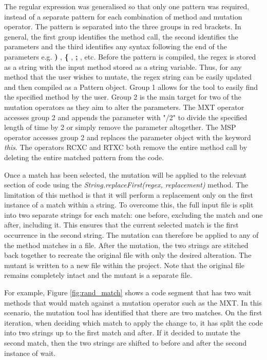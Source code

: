 \documentclass[a4paper,12pt]{article}
\begin{document}
The regular expression was generalised so that only one pattern was required, instead of a separate pattern for each combination of method and mutation operator. The pattern is separated into the three groups in red brackets. In general, the first group identifies the method call, the second identifies the parameters and the third identifies any syntax following the end of the parameters e.g. \textbf{)} , \textbf{\{} , \textbf{;} , etc. Before the pattern is compiled, the regex is stored as a string with the input method stored as a string variable. Thus, for any method that the user wishes to mutate, the regex string can be easily updated and then compiled as a Pattern object. Group 1 allows for the tool to easily find the specified method by the user. Group 2 is the main target for two of the mutation operators as they aim to alter the parameters. The MXT operator accesses group 2 and appends the parameter with "/2" to divide the specified length of time by 2 or simply remove the parameter altogether. The MSP operator accesses group 2 and replaces the parameter object with the keyword \textit{this}. The operators RCXC and RTXC both remove the entire method call by deleting the entire matched pattern from the code.       

Once a match has been selected, the mutation will be applied to the relevant section of code using the \textit{String.replaceFirst(regex, replacement)} method. The limitation of this method is that it will perform a replacement only on the first instance of a match within a string. To overcome this, the full input file is split into two separate strings for each match: one before, excluding the match and one after, including it. This ensures that the current selected match is the first occurrence in the second string. The mutation can therefore be applied to any of the method matches in a file. After the mutation, the two strings are stitched back together to recreate the original file with only the desired alteration. The mutant is written to a new file within the project. Note that the original file remains completely intact and the mutant is a separate file.

For example, Figure \ref{fig:rand_match} shows a code segment that has two wait methods that would match against a mutation operator such as the MXT. In this scenario, the mutation tool has identified that there are two matches. On the first iteration, when deciding which match to apply the change to, it has split the code into two strings up to the first match and after. If it decided to mutate the second match, then the two strings are shifted to before and after the second instance of wait. 
\end{document}
